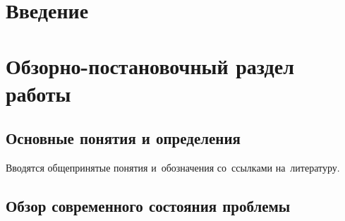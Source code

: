\documentclass[12pt]{article} %
\begin{document}
\section{Введение}



\section{Обзорно-постановочный раздел работы}

\subsection{Основные понятия и определения}
Вводятся общепринятые понятия и~обозначения со~ссылками на~литературу.

\subsection{Обзор современного состояния проблемы}


\newpage

\nocite{*}
\printbibliography[title={Список литературы}]
\end{document}
